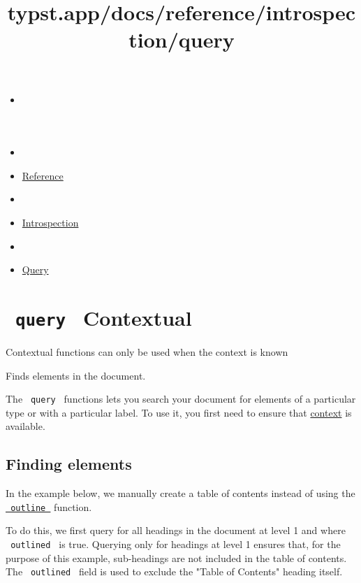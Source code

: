 \title{typst.app/docs/reference/introspection/query}

\begin{itemize}
\tightlist
\item
  \href{/docs}{}
\item
  
\item
  \href{/docs/reference/}{Reference}
\item
  
\item
  \href{/docs/reference/introspection/}{Introspection}
\item
  
\item
  \href{/docs/reference/introspection/query/}{Query}
\end{itemize}

\section{\texorpdfstring{\texttt{\ query\ } {{ Contextual
}}}{ query   Contextual }}\label{summary}

\label{contextual-tooltip}
Contextual functions can only be used when the context is known

Finds elements in the document.

The \texttt{\ query\ } functions lets you search your document for
elements of a particular type or with a particular label. To use it, you
first need to ensure that \href{/docs/reference/context/}{context} is
available.

\subsection{Finding elements}\label{finding-elements}

In the example below, we manually create a table of contents instead of
using the \href{/docs/reference/model/outline/}{\texttt{\ outline\ }}
function.

To do this, we first query for all headings in the document at level 1
and where \texttt{\ outlined\ } is true. Querying only for headings at
level 1 ensures that, for the purpose of this example, sub-headings are
not included in the table of contents. The \texttt{\ outlined\ } field
is used to exclude the "Table of Contents" heading itself.

